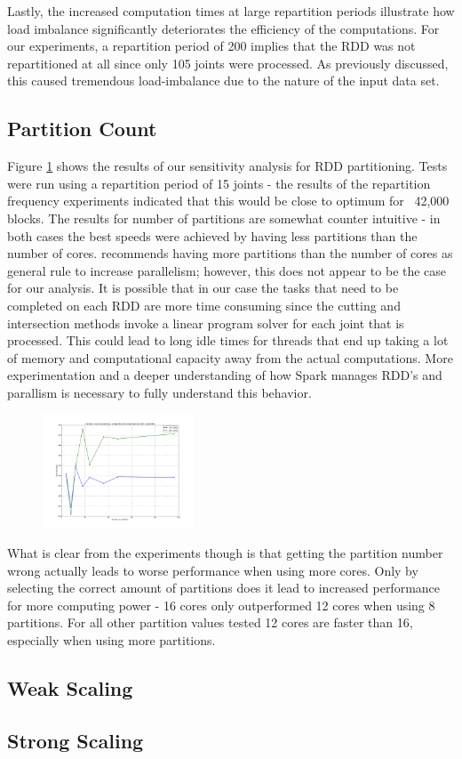 Lastly, the increased computation times at large repartition periods illustrate how load imbalance significantly deteriorates the efficiency of the computations. For our experiments, a repartition period of 200 implies that the RDD was not repartitioned at all since only 105 joints were processed. As previously discussed, this caused tremendous load-imbalance due to the nature of the input data set. \par

\subsection{Partition Count}
Figure \ref{fig:PartCount} shows the results of our sensitivity analysis for RDD partitioning. Tests were run using a repartition period of 15 joints - the results of the repartition frequency experiments indicated that this would be close to optimum for ~42,000 blocks. The results for number of partitions are somewhat counter intuitive - in both cases the best speeds were achieved by having less partitions than the number of cores. \cite{sparkTuning} recommends having more partitions than the number of cores as general rule to increase parallelism; however, this does not appear to be the case for our analysis. It is possible that in our case the tasks that need to be completed on each RDD are more time consuming since the cutting and intersection methods invoke a linear program solver for each joint that is processed. This could lead to long idle times for threads that end up taking a lot of memory and computational capacity away from the actual computations. More experimentation and a deeper understanding of how Spark manages RDD's and parallism is necessary to fully understand this behavior. \par

\begin{figure}
  \centering
  \includegraphics[width=0.4\textwidth]{PartCount} 
  \label{fig:PartCount}           
\end{figure}

What is clear from the experiments though is that getting the partition number wrong actually leads to worse performance when using more cores. Only by selecting the correct amount of partitions does it lead to increased performance for more computing power - 16 cores only outperformed 12 cores when using 8 partitions. For all other partition values tested 12 cores are faster than 16, especially when using more partitions.

\subsection{Weak Scaling}

\subsection{Strong Scaling}
